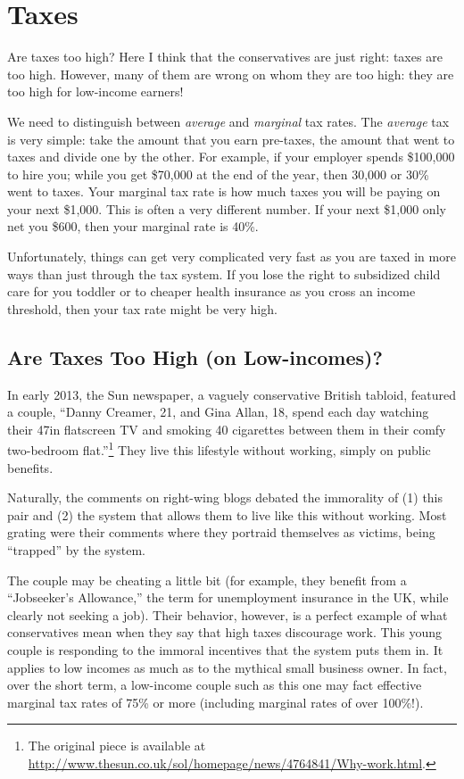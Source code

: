 \chapter{Taxes}%
\label{chpt:taxes}

Are taxes too high? Here I think that the conservatives are just right: taxes
are too high. However, many of them are wrong on whom they are too high: they
are too high for low-income earners!

We need to distinguish between \emph{average} and \emph{marginal} tax rates.
The \emph{average} tax is very simple: take the amount that you earn pre-taxes,
the amount that went to taxes and divide one by the other. For example, if your
employer spends \$100,000 to hire you; while you get \$70,000 at the end of the
year, then 30,000 or 30\% went to taxes. Your marginal tax rate is how much
taxes you will be paying on your next \$1,000. This is often a very different
number. If your next \$1,000 only net you \$600, then your marginal rate is
40\%. %

Unfortunately, things can get very complicated very fast as you are taxed in
more ways than just through the tax system. If you lose the right to subsidized
child care for you toddler or to cheaper health insurance as you cross an
income threshold, then your tax rate might be very high.

\section{Are Taxes Too High (on Low-incomes)?}

In early 2013, the Sun newspaper, a vaguely conservative British tabloid,
featured a couple, ``Danny Creamer, 21, and Gina Allan, 18, spend each day
watching their 47in flatscreen TV and smoking 40 cigarettes between them in
their comfy two-bedroom flat.''\footnote{The original piece is available at
\url{http://www.thesun.co.uk/sol/homepage/news/4764841/Why-work.html}.} They
live this lifestyle without working, simply on public benefits.

Naturally, the comments on right-wing blogs debated the immorality of (1) this
pair and (2) the system that allows them to live like this without working.
Most grating were their comments where they portraid themselves as victims,
being ``trapped'' by the system.

The couple may be cheating a little bit (for example, they benefit from a
``Jobseeker's Allowance,'' the term for unemployment insurance in the UK, while
clearly not seeking a job). Their behavior, however, is a perfect example of
what conservatives mean when they say that high taxes discourage work. This
young couple is responding to the immoral incentives that the system puts them
in. It applies to low incomes as much as to the mythical small business owner.
In fact, over the short term, a low-income couple such as this one may fact
effective marginal tax rates of 75\% or more (including marginal rates of over
100\%!).

